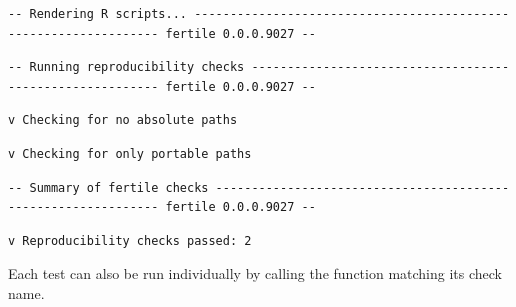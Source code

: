 \documentclass[12pt,twoside]{reedthesis}
\begin{document}
\begin{verbatim}
-- Rendering R scripts... ----------------------------------------------------------------- fertile 0.0.0.9027 --
\end{verbatim}
\begin{verbatim}
-- Running reproducibility checks --------------------------------------------------------- fertile 0.0.0.9027 --
\end{verbatim}
\begin{verbatim}
v Checking for no absolute paths
\end{verbatim}
\begin{verbatim}
v Checking for only portable paths
\end{verbatim}
\begin{verbatim}
-- Summary of fertile checks -------------------------------------------------------------- fertile 0.0.0.9027 --
\end{verbatim}
\begin{verbatim}
v Reproducibility checks passed: 2
\end{verbatim}
Each test can also be run individually by calling the function matching
its check name.
\end{document}
